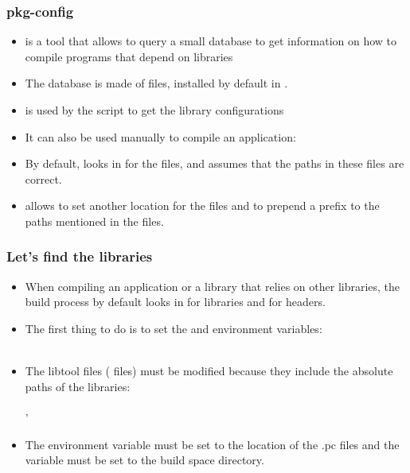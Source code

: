 \begin{frame}
  \frametitle{pkg-config}
  \begin{itemize}
  \item {} is a tool that allows to query a small
    database to get information on how to compile programs that depend
    on libraries
  \item The database is made of  files, installed by default in
    .
  \item {} is used by the  script to get the
    library configurations
  \item It can also be used manually to compile an application:\\
  \item By default,  looks in  for
    the  files, and assumes that the paths in these files
    are correct.
  \item {} allows to set another location for the
     files and  to prepend a
    prefix to the paths mentioned in the  files.
  \end{itemize}
\end{frame}

\begin{frame}
  \frametitle{Let's find the libraries}
  \begin{itemize}
  \item When compiling an application or a library that relies on
    other libraries, the build process by default looks in
     for libraries and  for headers.
  \item The first thing to do is to set the  and
     environment
    variables:\\
    \\
  \item The libtool files ( files) must be modified because they
    include the absolute paths of the libraries:\\
    \\
    '
  \item The  environment variable must be set to
    the location of the .pc files and the
     variable must be set to the build
    space directory.
\end{itemize}
\end{frame}


